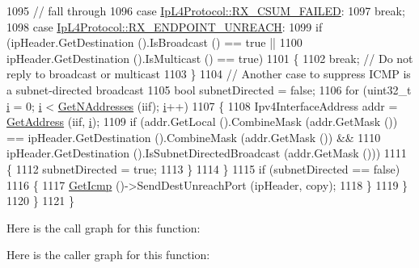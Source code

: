 \begin{DoxyCode}
1095         \textcolor{comment}{// fall through}
1096         \textcolor{keywordflow}{case} \hyperlink{classns3_1_1IpL4Protocol_afd3744c89902fff232e2fd45f558c80eaba0111c02656760e18ca30479e297b07}{IpL4Protocol::RX\_CSUM\_FAILED}:
1097           \textcolor{keywordflow}{break};
1098         \textcolor{keywordflow}{case} \hyperlink{classns3_1_1IpL4Protocol_afd3744c89902fff232e2fd45f558c80ea00e3d2a534b8bd353395254c0735948b}{IpL4Protocol::RX\_ENDPOINT\_UNREACH}:
1099           \textcolor{keywordflow}{if} (ipHeader.GetDestination ().IsBroadcast () == \textcolor{keyword}{true} ||
1100               ipHeader.GetDestination ().IsMulticast () == \textcolor{keyword}{true})
1101             \{
1102               \textcolor{keywordflow}{break}; \textcolor{comment}{// Do not reply to broadcast or multicast}
1103             \}
1104           \textcolor{comment}{// Another case to suppress ICMP is a subnet-directed broadcast}
1105           \textcolor{keywordtype}{bool} subnetDirected = \textcolor{keyword}{false};
1106           \textcolor{keywordflow}{for} (uint32\_t \hyperlink{bernuolliDistribution_8m_a6f6ccfcf58b31cb6412107d9d5281426}{i} = 0; \hyperlink{bernuolliDistribution_8m_a6f6ccfcf58b31cb6412107d9d5281426}{i} < \hyperlink{classns3_1_1Ipv4L3Protocol_ab816ec1b5f680117bc1363b3d9649b22}{GetNAddresses} (iif); \hyperlink{bernuolliDistribution_8m_a6f6ccfcf58b31cb6412107d9d5281426}{i}++)
1107             \{
1108               Ipv4InterfaceAddress addr = \hyperlink{classns3_1_1Ipv4L3Protocol_a85fa4287313a773dee29aa73fa74a7e0}{GetAddress} (iif, \hyperlink{bernuolliDistribution_8m_a6f6ccfcf58b31cb6412107d9d5281426}{i});
1109               \textcolor{keywordflow}{if} (addr.GetLocal ().CombineMask (addr.GetMask ()) == ipHeader.GetDestination ().CombineMask 
      (addr.GetMask ()) &&
1110                   ipHeader.GetDestination ().IsSubnetDirectedBroadcast (addr.GetMask ()))
1111                 \{
1112                   subnetDirected = \textcolor{keyword}{true};
1113                 \}
1114             \}
1115           \textcolor{keywordflow}{if} (subnetDirected == \textcolor{keyword}{false})
1116             \{
1117               \hyperlink{classns3_1_1Ipv4L3Protocol_a4dd2b3a24817ed50e7a6f41a5657551c}{GetIcmp} ()->SendDestUnreachPort (ipHeader, copy);
1118             \}
1119         \}
1120     \}
1121 \}
\end{DoxyCode}


Here is the call graph for this function\+:




Here is the caller graph for this function\+:


